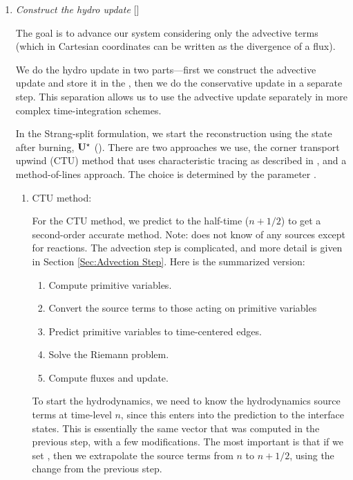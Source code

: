 \begin{enumerate}
\item \label{strang:hydro} {\em Construct the hydro update} []

  The goal is to advance our system considering only the advective
  terms (which in Cartesian coordinates can be written as the
  divergence of a flux).

  We do the hydro update in two parts---first we construct the
  advective update and store it in the 
  \multifab, then we do the conservative update in a separate step.  This
  separation allows us to use the advective update separately in more
  complex time-integration schemes.

  In the Strang-split formulation, we start the reconstruction using
  the state after burning, ${\bf U}^\star$ ().  There
  are two approaches we use, the corner transport upwind (CTU) method
  that uses characteristic tracing as described in
  \cite{colella:1990}, and a method-of-lines approach.  The choice is 
  determined by the parameter .

  \begin{enumerate}
  \item CTU method:

    For the CTU method, we predict to the half-time ($n+1/2$) to get a
    second-order accurate method.  Note:  does not
    know of any sources except for reactions.  The advection step is
    complicated, and more detail is given in Section
    \ref{Sec:Advection Step}.  Here is the summarized version:
  \begin{enumerate}
  \item Compute primitive variables.
  \item Convert the source terms to those acting on primitive variables
  \item Predict primitive variables to time-centered edges.
  \item Solve the Riemann problem.
  \item Compute fluxes and update.
  \end{enumerate}

  To start the hydrodynamics, we need to know the hydrodynamics source
  terms at time-level $n$, since this enters into the prediction to
  the interface states.  This is essentially the same vector that was
  computed in the previous step, with a few modifications.  The most
  important is that if we set
  , then we extrapolate the
  source terms from $n$ to $n+1/2$, using the change from the previous
  step.


\end{enumerate}
\end{enumerate}
